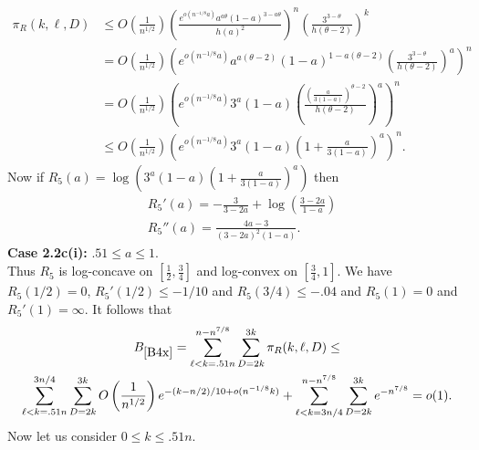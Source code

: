 \documentclass[11pt]{article}
\def\th{\theta}
\def\p{\pi}
\newcommand{\brac}[1]{\left(#1\right)}
\newcommand{\bfrac}[2]{\brac{\frac{#1}{#2}}}
\begin{document}
\begin{align*}
\p_R(k,\ell,D)&\leq O\bfrac{1}{n^{1/2}}\bfrac{e^{o(n^{-1/8}a)}a^{a\th}(1-a)^{3-a\th}}{h(a)^2}^n\bfrac{3^{3-\th}}{h\brac{\th-2}}^k\\
&=O\bfrac{1}{n^{1/2}}\brac{e^{o(n^{-1/8}a)}a^{a(\th-2)}(1-a)^{1-a(\th-2)}\bfrac{3^{3-\th}}{h(\th-2)}^a}^n\\
&= O\bfrac{1}{n^{1/2}}\brac{e^{o(n^{-1/8}a)}3^a(1-a)\bfrac{\bfrac{a}{3(1-a)}^{\th-2}}{h(\th-2)}^a}^n\\
&\le O\bfrac{1}{n^{1/2}}\brac{e^{o(n^{-1/8}a)}3^a(1-a)\brac{1+\frac{a}{3(1-a)}}^{a}}^n.
\end{align*}
Now if $R_5(a)=\log\brac{3^a(1-a)\brac{1+\frac{a}{3(1-a)}}^{a}}$ then
\begin{align*}
&R_5'(a)=-\frac{3}{3-2a}+\log\brac{\frac{3-2a}{1-a}}\\
&R_5''(a)=\frac{4a-3}{(3-2a)^2(1-a)}.
\end{align*}
{\bf Case 2.2c(i):} $.51\leq a\leq 1$.\\
Thus $R_5$ is log-concave on $[\frac{1}{2},\frac{3}{4}]$ and log-convex on $[\frac{3}{4},1]$. 
We have $R_5(1/2)=0$, $R_5'(1/2)\leq -1/10$
and $R_5(3/4)\leq -.04$ and $R_5(1)=0$ and $R_5'(1)=\infty$. It follows that
\begin{multline}\label{B4x}
B_{\ref{B4x}}=\sum_{\ell<k=.51n}^{n-n^{7/8}}\sum_{D=2k}^{3k}\p_R(k,\ell,D)\leq\\
\sum_{\ell<k=.51n}^{3n/4}\sum_{D=2k}^{3k}O\bfrac{1}{n^{1/2}}e^{-(k-n/2)/10+o(n^{-1/8}k)}
+\sum_{\ell<k=3n/4}^{n-n^{7/8}}\sum_{D=2k}^{3k}e^{-n^{7/8}}=o(1).
\end{multline}
Now let us consider $0\leq k\leq .51n$. 
\end{document}
